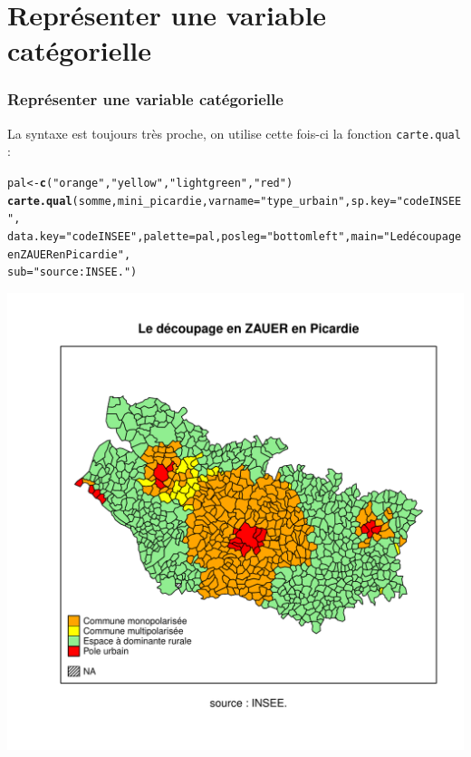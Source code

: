 \documentclass[slidetop, 10pt]{beamer}\usepackage{graphicx, color}
\makeatletter
\newcommand{\hlfunctioncall}[1]{\textcolor[rgb]{0.501960784313725,0,0.329411764705882}{\textbf{#1}}}%
\newcommand{\hlstring}[1]{\textcolor[rgb]{0.6,0.6,1}{#1}}%
\newenvironment{kframe}{%
 \def\at@end@of@kframe{}%
 \ifinner\ifhmode%
  \def\at@end@of@kframe{\end{minipage}}%
  \begin{minipage}{\columnwidth}%
 \fi\fi%
 \def\FrameCommand##1{\hskip\@totalleftmargin \hskip-\fboxsep
 \colorbox{shadecolor}{##1}\hskip-\fboxsep
     \hskip-\linewidth \hskip-\@totalleftmargin \hskip\columnwidth}%
 \MakeFramed {\advance\hsize-\width
   \@totalleftmargin\z@ \linewidth\hsize
   \@setminipage}}%
 {\par\unskip\endMakeFramed%
 \at@end@of@kframe}
\newenvironment{knitrout}{}{} %
\renewenvironment{knitrout}{\begin{tiny}}{\end{tiny}}
\makeatother
\begin{document}
\section{Représenter une variable catégorielle}
\begin{frame}[fragile]
\frametitle{Représenter une variable catégorielle}
La syntaxe est toujours très proche, on utilise cette fois-ci la fonction \verb!carte.qual! :

\begin{knitrout}\tiny
{}\color{fgcolor}\begin{kframe}
\begin{alltt}

pal <- \hlfunctioncall{c}(\hlstring{"orange"}, \hlstring{"yellow"}, \hlstring{"light green"}, \hlstring{"red"})
\hlfunctioncall{carte.qual}(somme, mini_picardie, varname = \hlstring{"type_urbain"}, sp.key = \hlstring{"codeINSEE"}, 
    data.key = \hlstring{"codeINSEE"}, palette = pal, posleg = \hlstring{"bottomleft"}, main = \hlstring{"Le découpage en ZAUER en Picardie"}, 
    sub = \hlstring{"source : INSEE."})
\end{alltt}
\end{kframe}

{\centering \includegraphics[width=.5\linewidth]{images/cartequal} 

}


\end{knitrout}


\end{frame}
\end{document}
